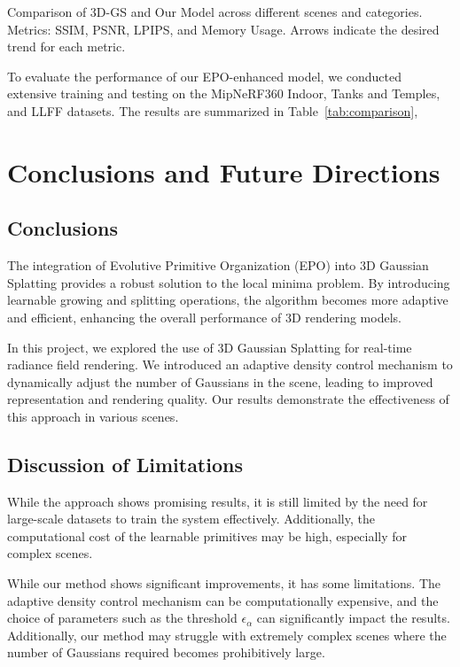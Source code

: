 \documentclass[11pt]{report}
\begin{document}
\begin{table}[htbp]
    \centering
    
    \caption{Comparison of 3D-GS and Our Model across different scenes and categories. Metrics: SSIM, PSNR, LPIPS, and Memory Usage. Arrows indicate the desired trend for each metric.}
    \label{tab:comparison}
\end{table}
To evaluate the performance of our EPO-enhanced model, we conducted extensive training and testing on the MipNeRF360 Indoor, Tanks and Temples, and LLFF datasets. The results are summarized in Table~\ref{tab:comparison}, 

\chapter{Conclusions and Future Directions}

\section{Conclusions}

The integration of Evolutive Primitive Organization (EPO) into 3D Gaussian Splatting provides a robust solution to the local minima problem. By introducing learnable growing and splitting operations, the algorithm becomes more adaptive and efficient, enhancing the overall performance of 3D rendering models.

In this project, we explored the use of 3D Gaussian Splatting for real-time radiance field rendering. We introduced an adaptive density control mechanism to dynamically adjust the number of Gaussians in the scene, leading to improved representation and rendering quality. Our results demonstrate the effectiveness of this approach in various scenes.

\section{Discussion of Limitations}

While the approach shows promising results, it is still limited by the need for large-scale datasets to train the system effectively. Additionally, the computational cost of the learnable primitives may be high, especially for complex scenes.

While our method shows significant improvements, it has some limitations. The adaptive density control mechanism can be computationally expensive, and the choice of parameters such as the threshold $\epsilon_\alpha$ can significantly impact the results. Additionally, our method may struggle with extremely complex scenes where the number of Gaussians required becomes prohibitively large.
\end{document}

